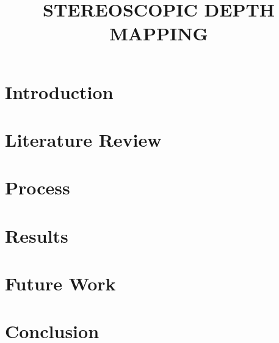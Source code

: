 \documentclass{article}
\begin{document}
\sloppy

\title{STEREOSCOPIC DEPTH MAPPING}
\address{Rose-Hulman Institute of Technology\\
Terre Haute, Indiana}


\maketitle
\thispagestyle{fancy} \fancyhead{} \lhead{}
\renewcommand{\headrulewidth}{0pt}
\renewcommand{\footrulewidth}{0pt}



\section{Introduction}
\label{sec:intro}


\section{Literature Review}
\label{sec:litreview}


\section{Process}
\label{sec:Process}


\section{Results}
\label{sec:Results}


\section{Future Work}
\label{sec:future}


\section{Conclusion}
\label{sec:conclusion}

\end{document}
